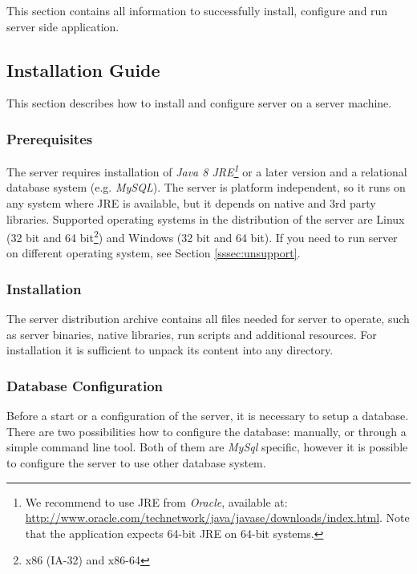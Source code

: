 
This section contains all information to successfully install, configure and run
\textan{} server side application.

\subsection{Installation Guide}

This section describes how to install and configure \textan{} server on a server
machine.

\subsubsection{Prerequisites}
\label{sssec:SerInstPre}

The \textan{} server requires installation of \emph{Java 8 JRE\footnote{We
recommend to use JRE from \emph{Oracle}, available at:
\url{http://www.oracle.com/technetwork/java/javase/downloads/index.html}.
Note that the application expects 64-bit JRE on 64-bit systems.}}
or a later version and a relational database system (e.g. \emph{MySQL}).
The server is platform independent, so it runs on any system where JRE is
available, but it depends on native and 3rd party libraries. Supported
operating systems in the distribution of the \textan{} server are Linux (32 bit
and 64 bit\footnote{x86 (IA-32) and x86-64}) and Windows (32 bit and 64 bit).  If you need to
run \textan{} server on different operating system, see Section
\ref{sssec:unsupport}.

\subsubsection{Installation}

The \textan{} server distribution archive contains all files needed for \textan{} server to operate,
such as server binaries, native libraries, run scripts and additional resources.
For installation it is sufficient to unpack its content into any directory.

\subsubsection{Database Configuration}
\label{sssec:DataConfig}

Before a start or a configuration of the \textan{} server, it is necessary to
setup a database. There are two possibilities how to configure the database:
manually, or through a simple command line tool. Both of them are \emph{MySql} specific,
however it is possible to configure the server to use other database system.


